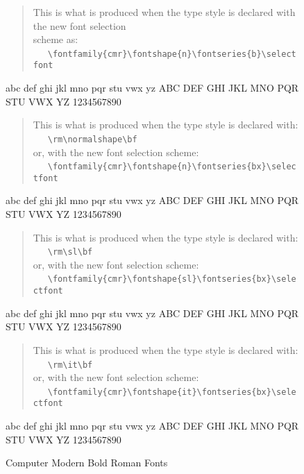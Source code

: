 \begin{figure}
\begin{singlespace}
\begin{verse}
This is what is produced when the type style is declared
with the new font selection\\
scheme as:\\
\ \ \ \verb+\fontfamily{cmr}\fontshape{n}\fontseries{b}\selectfont+\\
\end{verse}
{\selectfont
abc def ghi jkl mno pqr stu vwx yz ABC DEF GHI JKL MNO PQR STU
VWX YZ 1234567890\par}
\vspace{1em}
\begin{verse}
This is what is produced when the type style is declared with:\\
\ \ \ \verb+\rm\normalshape\bf+\\
or, with the new font selection scheme:\\
\ \ \ \verb+\fontfamily{cmr}\fontshape{n}\fontseries{bx}\selectfont+
\end{verse}
{\selectfont
abc def ghi jkl mno pqr stu vwx yz ABC DEF GHI JKL MNO PQR STU
VWX YZ 1234567890\par}
\vspace{1em}
\begin{verse}
This is what is produced when the type style is declared with:\\
\ \ \ \verb+\rm\sl\bf+\\
or, with the new font selection scheme:\\
\ \ \ \verb+\fontfamily{cmr}\fontshape{sl}\fontseries{bx}\selectfont+
\end{verse}
{\selectfont
abc def ghi jkl mno pqr stu vwx yz ABC DEF GHI JKL MNO PQR STU
VWX YZ 1234567890\par}
\vspace{1em}
\begin{verse}
This is what is produced when the type style is declared with:\\
\ \ \ \verb+\rm\it\bf+\\
or, with the new font selection scheme:\\
\ \ \ \verb+\fontfamily{cmr}\fontshape{it}\fontseries{bx}\selectfont+\\
\end{verse}
{\selectfont
abc def ghi jkl mno pqr stu vwx yz ABC DEF GHI JKL MNO PQR STU
VWX YZ 1234567890\par}
\vspace{1em}
\caption{Computer Modern Bold Roman Fonts}
\label{fig:cmrb}
\end{singlespace}
\end{figure}
 
